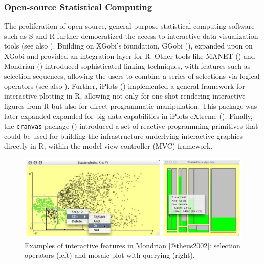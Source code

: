 \documentclass[
]{book}
\theoremstyle{definition}
\theoremstyle{definition}
\theoremstyle{definition}
\theoremstyle{definition}
\theoremstyle{remark}
\begin{document}
\subsubsection{Open-source Statistical Computing}\label{open-source-statistical-computing}

The proliferation of open-source, general-purpose statistical computing software such as S and R further democratized the access to interactive data visualization tools (see also ). Building on XGobi's foundation, GGobi (), expanded upon on XGobi and provided an integration layer for R. Other tools like MANET () and Mondrian () introduced sophisticated linking techniques, with features such as selection sequences, allowing the users to combine a series of selections via logical operators (see also ). Further, iPlots () implemented a general framework for interactive plotting in R, allowing not only for one-shot rendering interactive figures from R but also for direct programmatic manipulation. This package was later expanded expanded for big data capabilities in iPlots eXtreme (). Finally, the \texttt{cranvas} package () introduced a set of reactive programming primitives that could be used for building the infrastructure underlying interactive graphics directly in R, within the model-view-controller (MVC) framework.

\begin{figure}

{\centering \includegraphics[width=1\linewidth,height=1\textheight]{./figures/mondrian} 

}

\caption{Examples of interactive features in Mondrian [@theus2002]: selection operators (left) and mosaic plot with querying (right).}\label{fig:unnamed-chunk-6}
\end{figure}
\end{document}
